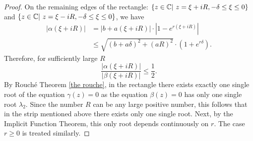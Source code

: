 \documentclass[12pt,letterpaper]{amsart}
\theoremstyle{definition}
\theoremstyle{remark}
\numberwithin{equation}{section}
\begin{document}
\begin{proof}
\medskip
On the remaining edges of the rectangle: $\{ z\in \mathbb C | \ z=\xi +iR, -\delta \le \xi \le 0\}$ and $\{ z\in \mathbb C | \ z=\xi -iR, -\delta \le \xi \le 0\}$, we have
\begin{align}
|\alpha (\xi +iR)| & = |b+a(\xi +iR)|\cdot |1-e^{r(\xi+iR)}| \nonumber\\
& \le \sqrt{(b+a\delta )^2 +(aR)^2} \cdot (1+e^{r\delta}).
\end{align}
Therefore, for sufficiently large $R$
\begin{equation}
\frac{|\alpha (\xi +iR)|}{|\beta(\xi+iR)|} \le \frac{1}{2}.
\end{equation}
By Rouch\' e Theorem \ref{the rouche}, in the rectangle there exists exactly one single root of the equation $\gamma (z)=0$ as the equation $\beta(z)=0$ has only one single root $\lambda_2$. Since the number $R$ can be any large positive number, this follows that in the strip mentioned above there exists only one single root. Next, by the Implicit Function Theorem, this only root depends continuously on $r$. The case $r\ge 0$ is treated similarly.
\end{proof}
\end{document}
